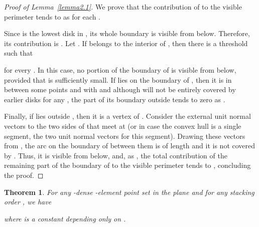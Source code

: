 \documentclass[11pt]{article}
\newtheorem{thm}{Theorem}             \newtheorem{lem}[thm]{Lemma}
\begin{document}
\begin{proof}[Proof of Lemma~\ref{lemma2.1}] We prove that the contribution of
 to the visible perimeter tends to  as
 for each .

Since  is the lowest disk in , its whole
boundary is visible from below. Therefore, its contribution is . Let
.
If  belongs to the interior of , then there is a threshold  such that

for every . In this case, no portion of the boundary of  is visible from below, provided that  is sufficiently small. If
 lies on the boundary of , then it is
in between some points  and  with  and although  will not be entirely covered by earlier disks for any ,
the part of its boundary outside  tends to zero as .

Finally, if  lies outside , then it is a
vertex of . Consider the external unit normal vectors
to the two sides of  that meet at  (or in
case the convex hull is a single segment, the two unit normal vectors
for this segment). Drawing these vectors from , the arc on the
boundary of  between them is of length  and it is not covered by . Thus, it is visible from below, and, as , the total contribution of the remaining part of the boundary of  to the visible perimeter tends to , concluding the proof.
\end{proof}

{
\renewcommand{\thethm}{2}
\begin{thm}For any -dense -element point set  in the plane and for any stacking order , we have

where  is a constant depending only on .
\end{thm}
\addtocounter{thm}{-1}
}
\end{document}
